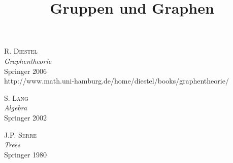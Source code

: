 \documentclass[a4paper, 12pt, twoside]{article}
\title{\Huge \textbf{
\textsf{Gruppen und Graphen}}}
\date{}
\begin{document}
\maketitle
\begin{center}
\end{center}
\newpage
\tableofcontents
\newpage







\appendix



\newpage
\begin{thebibliography}{10}


 \textsc{R. Diestel}\\
\textsl{Graphentheorie}\\
Springer 2006\\
\textsf{http://www.math.uni-hamburg.de/home/diestel/books/graphentheorie/}

 \textsc{S. Lang}\\
\textsl{Algebra}\\
Springer 2002

 \textsc{J.P. Serre}\\
\textsl{Trees}\\
Springer 1980


\end{thebibliography}

\newpage
{}
\small
\printindex
\end{document}
